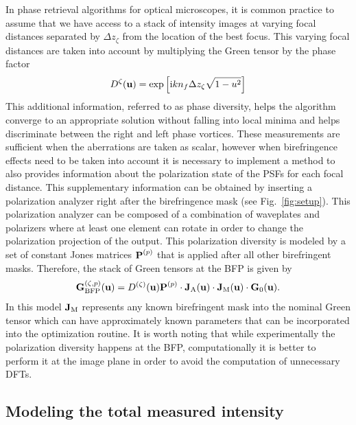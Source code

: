 \documentclass[reprint,aps,pra,superscriptaddress,
amsmath,amssymb]{revtex4-1}
\begin{document}
In phase retrieval algorithms for optical microscopes, it is common 
practice to assume that we have access to a stack of intensity images 
at varying focal distances separated by $\Delta z_{\zeta}$ from the 
location of the best focus. This varying focal 
distances are taken into account by multiplying the Green tensor by 
the phase factor
\begin{align}
D^\zeta (\textbf u) =  \exp \left[ \text{i} k n_f \Delta z_\zeta  \sqrt{1 - u^2} \right] 
\end{align}
This additional information, referred to as phase diversity, helps the 
algorithm converge to an appropriate solution without falling into 
local minima and helps discriminate between the right and left phase vortices. 
These measurements are sufficient when the aberrations are taken as 
scalar, however when birefringence effects need to be taken into account 
it is necessary to implement a method to also provides information 
about the polarization state of the PSFs for each focal distance. 
This supplementary information can be obtained by inserting a polarization 
analyzer right after the 
birefringence mask (see Fig.~\ref{fig:setup}). This polarization analyzer 
can be composed of a combination of waveplates and polarizers where at least
one element can rotate in order to change the polarization projection of 
the output. This polarization diversity is modeled by a set of constant 
Jones matrices $\textbf P^{(p)}$ that is applied after all other birefringent masks.
Therefore, the stack of Green tensors at the BFP is given by
\begin{align}
\textbf G^{(\zeta ,p)}_\text{BFP} (\textbf u) =  D^{(\zeta )} (\textbf u) \textbf P^{(p)} 
\cdot \textbf J_\text{A}(\textbf u) \cdot \textbf J_\text{M}(\textbf u) \cdot \textbf G_0  (\textbf u).
\end{align}
In this model $\textbf J_\text{M}$ represents any known
birefringent mask into the nominal Green tensor which can have approximately known
parameters that can be incorporated into the optimization routine.
It is worth noting that while experimentally the polarization diversity happens at 
the BFP, computationally it is better to perform it at the image plane in 
order to avoid the computation of unnecessary DFTs.


\subsection{Modeling the total measured intensity}
\end{document}
